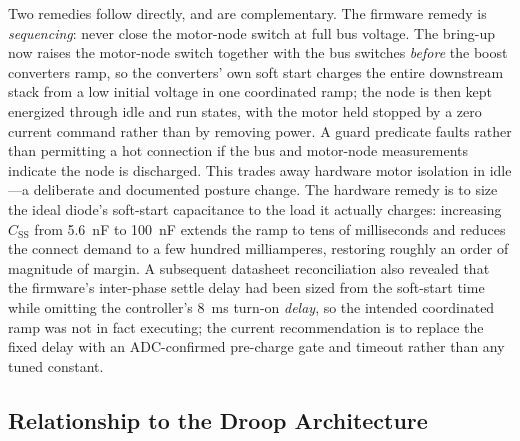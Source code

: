 
Two remedies follow directly, and are complementary. The firmware remedy is
\emph{sequencing}: never close the motor-node switch at full bus voltage. The
bring-up now raises the motor-node switch together with the bus switches
\emph{before} the boost converters ramp, so the converters' own soft start charges
the entire downstream stack from a low initial voltage in one coordinated ramp; the
node is then kept energized through idle and run states, with the motor held
stopped by a zero current command rather than by removing power. A guard predicate
faults rather than permitting a hot connection if the bus and motor-node
measurements indicate the node is discharged. This trades away hardware motor
isolation in idle---a deliberate and documented posture change. The hardware remedy
is to size the ideal diode's soft-start capacitance to the load it actually
charges: increasing $C_\mathrm{SS}$ from \SI{5.6}{\nano\farad} to
\SI{100}{\nano\farad} extends the ramp to tens of milliseconds and reduces the
connect demand to a few hundred milliamperes, restoring roughly an order of
magnitude of margin. A subsequent datasheet reconciliation also revealed that the
firmware's inter-phase settle delay had been sized from the soft-start time while
omitting the controller's \SI{8}{\milli\second} turn-on \emph{delay}, so the
intended coordinated ramp was not in fact executing; the current recommendation is
to replace the fixed delay with an ADC-confirmed pre-charge gate and timeout rather
than any tuned constant.

\subsection{Relationship to the Droop Architecture}
\label{sec:bringup:droop-relevance}

